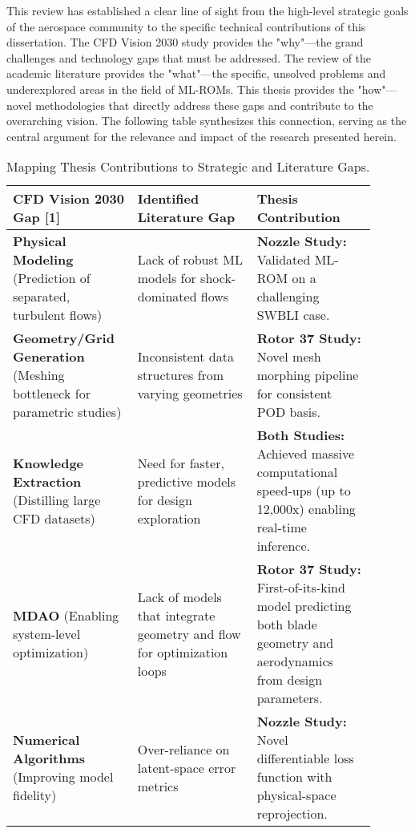 \documentclass[12pt, a4paper]{report}
\begin{document}
This review has established a clear line of sight from the high-level strategic goals of the aerospace community to the specific technical contributions of this dissertation. The CFD Vision 2030 study provides the "why"—the grand challenges and technology gaps that must be addressed. The review of the academic literature provides the "what"—the specific, unsolved problems and underexplored areas in the field of ML-ROMs. This thesis provides the "how"—novel methodologies that directly address these gaps and contribute to the overarching vision. The following table synthesizes this connection, serving as the central argument for the relevance and impact of the research presented herein.

\begin{table}[h!]
\centering
\caption{Mapping Thesis Contributions to Strategic and Literature Gaps.}
\label{tab:synthesis_map}
\begin{tabular}{p{0.3\linewidth} p{0.3\linewidth} p{0.3\linewidth}}
\toprule
\textbf{CFD Vision 2030 Gap [1]} & \textbf{Identified Literature Gap} & \textbf{Thesis Contribution} \\
\midrule
\textbf{Physical Modeling} (Prediction of separated, turbulent flows) & Lack of robust ML models for shock-dominated flows & \textbf{Nozzle Study:} Validated ML-ROM on a challenging SWBLI case. \\
\addlinespace
\textbf{Geometry/Grid Generation} (Meshing bottleneck for parametric studies) & Inconsistent data structures from varying geometries & \textbf{Rotor 37 Study:} Novel mesh morphing pipeline for consistent POD basis. \\
\addlinespace
\textbf{Knowledge Extraction} (Distilling large CFD datasets) & Need for faster, predictive models for design exploration & \textbf{Both Studies:} Achieved massive computational speed-ups (up to 12,000x) enabling real-time inference. \\
\addlinespace
\textbf{MDAO} (Enabling system-level optimization) & Lack of models that integrate geometry and flow for optimization loops & \textbf{Rotor 37 Study:} First-of-its-kind model predicting both blade geometry and aerodynamics from design parameters. \\
\addlinespace
\textbf{Numerical Algorithms} (Improving model fidelity) & Over-reliance on latent-space error metrics & \textbf{Nozzle Study:} Novel differentiable loss function with physical-space reprojection. \\
\bottomrule
\end{tabular}
\end{table}
\end{document}

